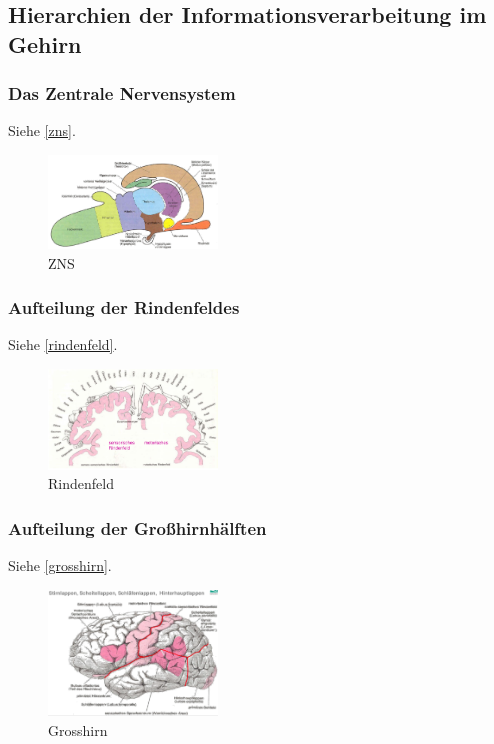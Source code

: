 \subsection{Hierarchien der Informationsverarbeitung im Gehirn}
\subsubsection{Das Zentrale Nervensystem}
Siehe \autoref{zns}.
\begin{figure}[h!]
	\centering
	\includegraphics[width=0.4\textwidth]{figures/ch07_zns.png}
	\caption{ZNS}
	\label{zns}
\end{figure}
\subsubsection{Aufteilung der Rindenfeldes}
Siehe \autoref{rindenfeld}.
\begin{figure}[h!]
	\centering
	\includegraphics[width=0.4\textwidth]{figures/ch07_rindenfeld.png}
	\caption{Rindenfeld}
	\label{rindenfeld}
\end{figure}
\subsubsection{Aufteilung der Großhirnhälften}
Siehe \autoref{grosshirn}.
\begin{figure}[h!]
	\centering
	\includegraphics[width=0.4\textwidth]{figures/ch07_grosshirn.png}
	\caption{Grosshirn}
	\label{grosshirn}
\end{figure}
